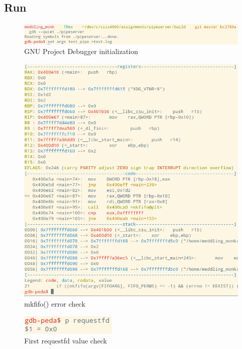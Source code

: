 \documentclass[letter,12pt,sffamily]{article}
\begin{document}
\subsection{Run}
\begin{figure}[H]
	\centering
	\includegraphics[width=1\linewidth]{./images/3}
	\caption[starting_GDB]{GNU Project Debugger initialization}
	\label{fig:3}
\end{figure}
\begin{figure}[H]
	\centering
	\includegraphics[width=1\linewidth]{./images/4}
	\caption[mkfifo_error_check]{mkfifo() error check}
	\label{fig:4}
\end{figure}
\begin{figure}[H]
	\centering
	\includegraphics[width=0.3\linewidth]{./images/5}
	\caption[requestfd_val_check_1]{First requestfd value check}
	\label{fig:5}
\end{figure}
\end{document}

